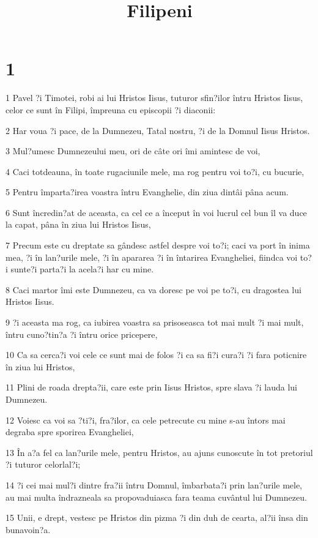 

\title{Filipeni}


\chapter{1}

\par 1 Pavel ?i Timotei, robi ai lui Hristos Iisus, tuturor sfin?ilor întru Hristos Iisus, celor ce sunt în Filipi, împreuna cu episcopii ?i diaconii:
\par 2 Har voua ?i pace, de la Dumnezeu, Tatal nostru, ?i de la Domnul Iisus Hristos.
\par 3 Mul?umesc Dumnezeului meu, ori de câte ori îmi amintesc de voi,
\par 4 Caci totdeauna, în toate rugaciunile mele, ma rog pentru voi to?i, cu bucurie,
\par 5 Pentru împarta?irea voastra întru Evanghelie, din ziua dintâi pâna acum.
\par 6 Sunt încredin?at de aceasta, ca cel ce a început în voi lucrul cel bun îl va duce la capat, pâna în ziua lui Hristos Iisus,
\par 7 Precum este cu dreptate sa gândesc astfel despre voi to?i; caci va port în inima mea, ?i în lan?urile mele, ?i în apararea ?i în întarirea Evangheliei, fiindca voi to?i sunte?i parta?i la acela?i har cu mine.
\par 8 Caci martor îmi este Dumnezeu, ca va doresc pe voi pe to?i, cu dragostea lui Hristos Iisus.
\par 9 ?i aceasta ma rog, ca iubirea voastra sa prisoseasca tot mai mult ?i mai mult, întru cuno?tin?a ?i întru orice pricepere,
\par 10 Ca sa cerca?i voi cele ce sunt mai de folos ?i ca sa fi?i cura?i ?i fara poticnire în ziua lui Hristos,
\par 11 Plini de roada drepta?ii, care este prin Iisus Hristos, spre slava ?i lauda lui Dumnezeu.
\par 12 Voiesc ca voi sa ?ti?i, fra?ilor, ca cele petrecute cu mine s-au întors mai degraba spre sporirea Evangheliei,
\par 13 În a?a fel ca lan?urile mele, pentru Hristos, au ajuns cunoscute în tot pretoriul ?i tuturor celorlal?i;
\par 14 ?i cei mai mul?i dintre fra?ii întru Domnul, îmbarbata?i prin lan?urile mele, au mai multa îndrazneala sa propovaduiasca fara teama cuvântul lui Dumnezeu.
\par 15 Unii, e drept, vestesc pe Hristos din pizma ?i din duh de cearta, al?ii însa din bunavoin?a.
